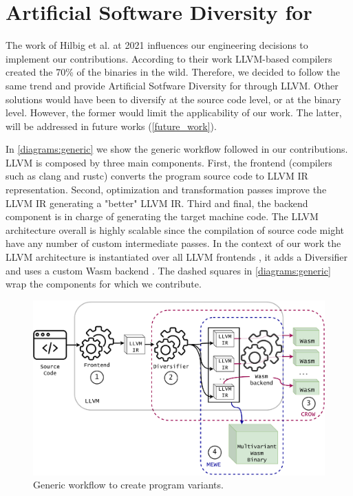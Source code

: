 \section{Artificial Software Diversity for \wasm}

The work of Hilbig et al. \cite{Hilbig2021AnES} at 2021 influences our engineering decisions to implement our contributions. According to their work LLVM-based compilers created the 70\% of the \wasm binaries in the wild. Therefore, we decided to follow the same trend and provide Artificial Sotfware Diversity for \wasm through LLVM. 
Other solutions would have been to diversify at the source code level, or at the \wasm binary level. However, the former would limit the applicability of our work. The latter, will be addressed in future works (\autoref{future_work}).

In \autoref{diagrams:generic} we show the generic workflow followed in our contributions. LLVM is composed by three main components. First, the frontend (compilers such as clang and rustc) converts the program source code to LLVM IR representation. Second, optimization and transformation passes improve the LLVM IR generating a "better" LLVM IR. Third and final, the backend component is in charge of generating the target machine code. The LLVM architecture overall is highly scalable since the compilation of source code might have any number of custom intermediate passes. 
In the context of our work the LLVM architecture is instantiated over all LLVM frontends , it adds a Diversifier  and uses a custom Wasm backend .
The dashed squares in \autoref{diagrams:generic} wrap the components for which we contribute.

\begin{figure}[h]
    \includegraphics[width=\linewidth]{diagrams/architecture.pdf}
    \caption{Generic workflow to create \wasm program variants.}
    \label{diagrams:generic}
\end{figure}



